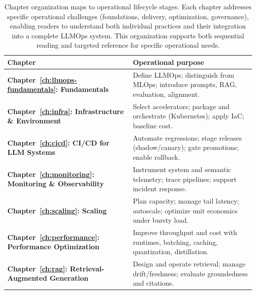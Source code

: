\begin{table}[t]
\centering
\small
\caption{Chapter organization maps to operational lifecycle stages. Each chapter addresses specific operational challenges (foundations, delivery, optimization, governance), enabling readers to understand both individual practices and their integration into a complete LLMOps system. This organization supports both sequential reading and targeted reference for specific operational needs.}
\label{tab:ch01_llmops_legend}
\setlength{\tabcolsep}{6pt}
\renewcommand{\arraystretch}{1.3}
\begin{tabularx}{\linewidth}{@{}p{52mm}X@{}}
\toprule
\rowcolor{gray!15}
\textbf{Chapter} & \textbf{Operational purpose} \\
\midrule
\textbf{Chapter~\ref{ch:llmops-fundamentals}: Fundamentals} &
Define LLMOps; distinguish from MLOps; introduce prompts, RAG, evaluation, alignment. \\

\textbf{Chapter~\ref{ch:infra}: Infrastructure \& Environment} &
Select accelerators; package and orchestrate (Kubernetes); apply IaC; baseline cost. \\

\textbf{Chapter~\ref{ch:cicd}: CI/CD for LLM Systems} &
Automate regressions; stage releases (shadow/canary); gate promotions; enable rollback. \\

\textbf{Chapter~\ref{ch:monitoring}: Monitoring \& Observability} &
Instrument system and semantic telemetry; trace pipelines; support incident response. \\

\textbf{Chapter~\ref{ch:scaling}: Scaling} &
Plan capacity; manage tail latency; autoscale; optimize unit economics under bursty load. \\

\textbf{Chapter~\ref{ch:performance}: Performance Optimization} &
Improve throughput and cost with runtimes, batching, caching, quantization, distillation. \\

\textbf{Chapter~\ref{ch:rag}: Retrieval-Augmented Generation} &
Design and operate retrieval; manage drift/freshness; evaluate groundedness and citations. \\


\end{tabularx}
\end{table}
